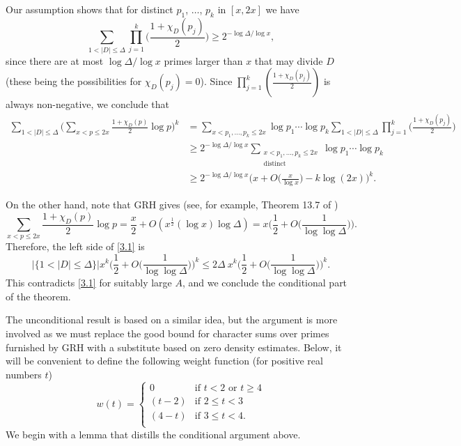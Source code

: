 \documentclass[11pt,makeidx, reqno]{amsart}
\theoremstyle{mystyle}
\theoremstyle{definition}
\begin{document}
Our assumption shows that for distinct $p_1$, $\ldots$, $p_k$ in $[x,2x]$ we have 
$$ 
\sum_{1<|D|\le \Delta} \prod_{j=1}^{k} \Big(\frac{1+\chi_D(p_j)}{2} \Big) \ge 2^{-\log \Delta/\log x}, 
$$
since there are at most $\log \Delta/\log x$ primes larger than $x$ that may divide $D$ (these being the possibilities for $\chi_D(p_j)=0$). 
Since $\prod_{j=1}^{k} (\frac{1+\chi_D(p_j)}{2})$ is always non-negative, we conclude that 
\begin{align}
\label{3.1}
\sum_{1<|D|\le \Delta} \Big( \sum_{x<p\le 2x} \frac{1+\chi_D(p)}{2} \log p\Big)^k &= \sum_{x < p_1, \ldots, p_k \le 2x} \log p_1 \cdots \log p_k \sum_{1<|D|\le \Delta} \prod_{j=1}^k \Big(\frac{1+\chi_D(p_j)}{2}\Big) \nonumber\\
&\ge 2^{-\log \Delta/\log x} \sum_{\substack{ x< p_1, \ldots, p_k \le 2x \\ \text{distinct} }} \log p_1 \cdots \log p_k \nonumber \\ 
&\ge 2^{-\log \Delta/\log x}
\Big( x+ O\Big(\frac {x}{\log x}\Big)-k \log (2x)\Big)^k.
\end{align}


On the other hand, note that GRH gives (see, for example, Theorem 13.7 of \cite{montgomeryVaughan})
$$ 
\sum_{x< p\le 2x} \frac{1+\chi_D(p)}{2} \log p = \frac{x}{2} + O(x^{\frac 12} (\log x)\log \Delta)=x \Big(\frac 12+O\Big(\frac{1}{\log \log \Delta}\Big)\Big). 
$$
Therefore, the left side of \eqref{3.1} is 
\begin{equation*}
 |\{1<|D|\le \Delta\}| x^k \Big(\frac 12 + O\Big(\frac{1}{\log \log \Delta}\Big)\Big)^k \le 2\Delta \ x^k \Big(\frac 12 + O\Big(\frac{1}{\log \log \Delta}\Big)\Big)^k.
\end{equation*}
This contradicts \eqref{3.1} for suitably large $A$, and we conclude the conditional part of the theorem.  

The unconditional result is based on a similar idea, but the argument is more involved as we must replace the good bound for character sums over primes furnished by GRH with a substitute based on zero density estimates.   Below, it will be convenient to define the following weight function (for positive real numbers $t$) 
\begin{equation} 
\label{3.2}
w(t) = \begin{cases} 
0 &\text{if } t<2 \text{ or } t \ge 4 \\
(t-2) &\text{if } 2 \le t < 3\\ 
(4-t) &\text{if } 3\le t <4. \\
\end{cases}
\end{equation}
We begin with a lemma that distills the conditional argument above.  
\end{document}
